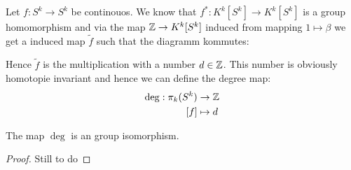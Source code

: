 \begin{definition}
	Let $f: S^k\to S^k$ be continouos. We know that $f^*:K^k[S^k]\to K^k[S^k]$ is a group homomorphism and via the map $\mathbb{Z} \to K^k[S^k]$ induced from mapping $1\mapsto \beta$ we get a induced map $\tilde{f}$ such that the diagramm kommutes:
	\begin{center}
	\end{center} Hence $\tilde{f}$ is the multiplication with a number $d\in \mathbb{Z}$. This number is obviously homotopie invariant and hence we can define the degree map:
	\begin{align*}
		\deg: \pi_k(S^k)&\to \mathbb{Z}\\
		[f]&\mapsto d
	\end{align*}
\end{definition}
\begin{corollary}
	The map $\deg$ is an group isomorphism. 
\end{corollary}
\begin{proof}
Still to do
\end{proof}


